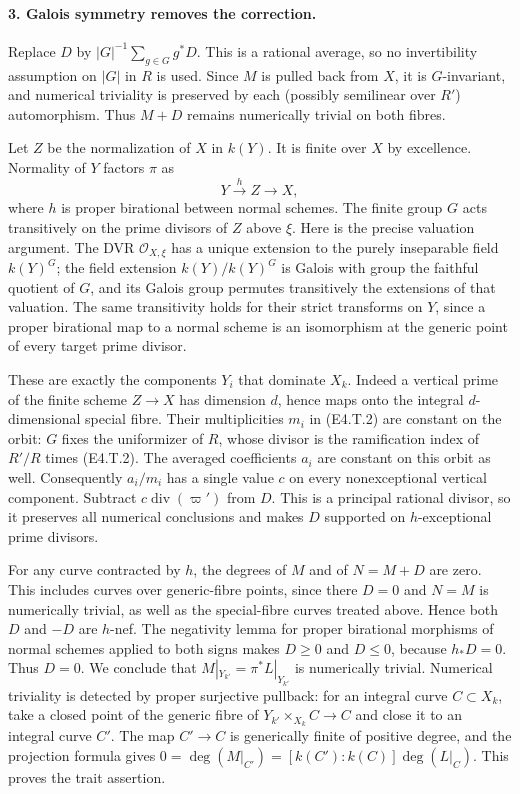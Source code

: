 \paragraph{3. Galois symmetry removes the correction.}
Replace $D$ by $|G|^{-1}\sum_{g\in G}g^*D$. This is a rational average,
so no invertibility assumption on $|G|$ in $R$ is used. Since $M$ is pulled
back from $X$, it is $G$-invariant, and numerical triviality is preserved
by each (possibly semilinear over $R'$) automorphism. Thus $M+D$ remains
numerically trivial on both fibres.

Let $Z$ be the normalization of $X$ in $k(Y)$. It is finite over $X$ by
excellence. Normality of $Y$ factors $\pi$ as
\[
 Y\xrightarrow{h}Z\longrightarrow X,
\]
where $h$ is proper birational between normal schemes. The finite group
$G$ acts transitively on the prime divisors of $Z$ above $\xi$.
Here is the precise valuation argument. The DVR $\mathcal O_{X,\xi}$ has
a unique extension to the purely inseparable field $k(Y)^G$; the field
extension $k(Y)/k(Y)^G$ is Galois with group the faithful quotient of $G$,
and its Galois group permutes transitively the extensions of that valuation.
The same transitivity holds for their strict transforms on $Y$, since
a proper birational map to a normal scheme is an isomorphism at the
generic point of every target prime divisor.

These are exactly the components $Y_i$ that dominate $X_k$. Indeed a
vertical prime of the finite scheme $Z\to X$ has dimension $d$, hence
maps onto the integral $d$-dimensional special fibre. Their multiplicities
$m_i$ in (E4.T.2) are constant on the orbit: $G$ fixes the uniformizer of
$R$, whose divisor is the ramification index of $R'/R$ times (E4.T.2).
The averaged coefficients $a_i$ are constant on this orbit as well.
Consequently $a_i/m_i$ has a single value $c$ on every nonexceptional
vertical component. Subtract $c\operatorname{div}(\varpi')$ from $D$.
This is a principal rational divisor, so it preserves all numerical
conclusions and makes $D$ supported on $h$-exceptional prime divisors.

For any curve contracted by $h$, the degrees of $M$ and of $N=M+D$ are
zero. This includes curves over generic-fibre points, since there $D=0$
and $N=M$ is numerically trivial, as well as the special-fibre curves
treated above. Hence both $D$ and $-D$ are $h$-nef. The negativity lemma for proper
birational morphisms of normal schemes
\cite[Lemma~11.60, p.~436]{KollarFamilies} applied to both signs makes
$D\geq0$ and $D\leq0$, because $h_*D=0$. Thus $D=0$.
We conclude that $M|_{Y_{k'}}=\pi^*L|_{Y_{k'}}$ is numerically trivial.
Numerical triviality is detected by proper surjective pullback: for an
integral curve $C\subset X_k$, take a closed point of the generic fibre
of $Y_{k'}\times_{X_k}C\to C$ and close it to an integral curve $C'$.
The map $C'\to C$ is generically finite of positive degree, and the
projection formula gives
$0=\deg(M|_{C'})=[k(C'):k(C)]\deg(L|_C)$.
This proves the trait assertion.

